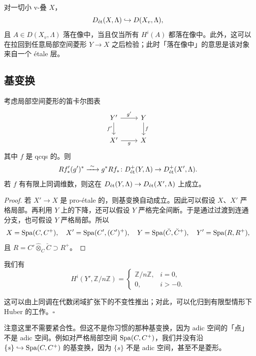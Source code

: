 \begin{proposition}
对一切小 v-叠 $X$，
\[
D_{\et}(X,\Lambda)\hookrightarrow D(X_v,\Lambda),
\]
且 $A\in D(X_v,\Lambda)$ 落在像中，当且仅当所有 $H^i(A)$ 都落在像中。此外，这可以在拉回到任意局部空间菱形 $Y\to X$ 之后检验；此时「落在像中」的意思是该对象来自一个 étale 层。
\end{proposition}

\subsection{基变换}

\begin{theorem}
考虑局部空间菱形的笛卡尔图表
\[
\begin{tikzcd}
Y' \arrow[r, "g'"] \arrow[d, "f'"'] & Y \arrow[d, "f"] \\
X' \arrow[r, "g"'] & X
\end{tikzcd}
\]
其中 $f$ 是 qcqs 的。则
\[
Rf'_*(g')^*\xrightarrow{\ \sim\ }g^*Rf_*\colon D^+_{\et}(Y,\Lambda)\to D^+_{\et}(X',\Lambda).
\]
若 $f$ 有有限上同调维数，则这在 $D_{\et}(Y,\Lambda)\to D_{\et}(X',\Lambda)$ 上成立。
\end{theorem}

\begin{proof}
若 $X'\to X$ 是 pro-étale 的，则基变换自动成立。因此可以假设 $X$、$X'$ 严格局部。再利用 $Y$ 上的下降，还可以假设 $Y$ 严格完全间断。于是通过过渡到连通分支，也可假设 $Y$ 严格局部。所以
\[
X=\Spa(C,C^+),\quad X'=\Spa(C',(C')^+),\quad Y=\Spa(\breve C,\breve C^+),\quad Y'=\Spa(R,R^+),
\]
且 $R=C'\widehat{\otimes}_C\breve C\supset R^+$。
\end{proof}

\begin{lemma}
我们有
\[
H^i(Y',\mathbb{Z}/n\mathbb{Z})=
\begin{cases}
\mathbb{Z}/n\mathbb{Z}, & i=0,\\
0, & i>-0.
\end{cases}
\]
\end{lemma}

这可以由上同调在代数闭域扩张下的不变性推出；对此，可以化归到有限型情形下 Huber 的工作。\hfill$\square$

注意这里不需要紧合性。但这不是你习惯的那种基变换，因为 adic 空间的「点」不是 adic 空间。例如对严格局部空间 $\Spa(C,C^+)$，我们并没有沿 $\{s\}\hookrightarrow\Spa(C,C^+)$ 的基变换，因为 $\{s\}$ 不是 adic 空间，甚至不是菱形。


